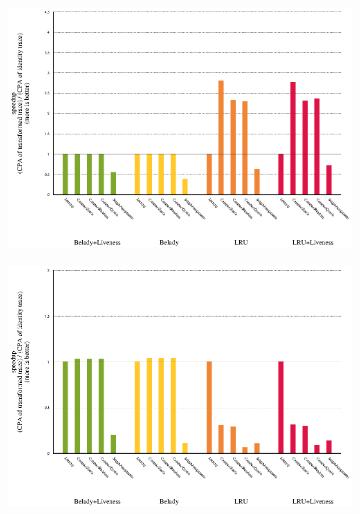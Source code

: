 \documentclass[onecolumn, openright, master, english, signatures]{dbrgrptt}
\begin{document}
\begin{figure}[!ht]
\begin{subfigure}[b]{0.5\textwidth}
  \end{subfigure}%
  \begin{subfigure}[b]{0.5\textwidth}%
    \includegraphics[width=\textwidth]{figs/plots/speedup-462-libquantum.eps}
  \end{subfigure}%
  \qquad
  \begin{subfigure}[b]{0.5\textwidth}%
    \includegraphics[width=\textwidth]{figs/plots/speedup-471-omnetpp.eps}
  \end{subfigure}%
  \begin{subfigure}[b]{0.5\textwidth}%

\end{subfigure}
\end{figure}
\end{document}
